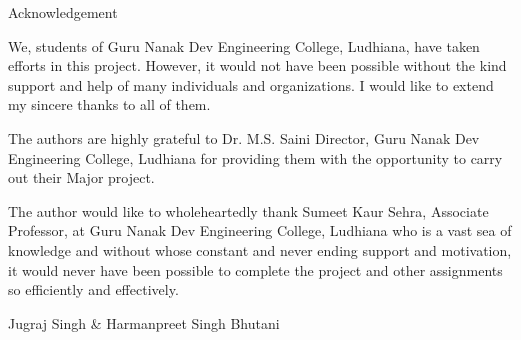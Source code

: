 \begin{center}
	{\LARGE Acknowledgement}
\end{center}

We, students of Guru Nanak Dev Engineering College, Ludhiana, have taken efforts in this project.
However, it would not have been possible without the kind support and help of many individuals
and organizations. I would like to extend my sincere thanks to all of them.

The authors are highly grateful to Dr. M.S. Saini Director, Guru Nanak Dev Engineering College, Ludhiana for providing them with the opportunity to carry out their Major project.

The author would like to wholeheartedly thank Sumeet Kaur Sehra, Associate Professor, at Guru Nanak Dev Engineering College, Ludhiana who is a vast sea of knowledge and
without whose constant and never ending support and motivation, it would never have been
possible to complete the project and other assignments so efficiently and effectively.

\vskip 1.0cm 
\noindent Jugraj Singh \& Harmanpreet Singh Bhutani